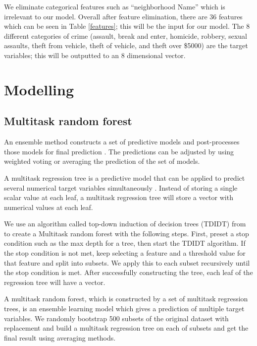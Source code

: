 \documentclass{article}
\begin{document}
We eliminate categorical features such as “neighborhood Name” which is irrelevant to our model. Overall after feature elimination, there are 36 features which can be seen in Table \ref{features}; this will be the input for our model. The 8 different categories of crime (assault, break and enter, homicide, robbery, sexual assaults, theft from vehicle, theft of vehicle, and theft over \$5000) are the target variables; this will be outputted to an 8 dimensional vector.


\section{Modelling}
\label{modelling}

\subsection{Multitask random forest}

An ensemble method constructs a set of predictive models and post-processes those models for final prediction \citep{kocev_ensembles_2007}. The predictions can be adjusted by using weighted voting or averaging the prediction of the set of models.

A multitask regression tree is a predictive model that can be applied to predict several numerical target variables simultaneously \citep{kocev_ensembles_2007}. Instead of storing a single scalar value at each leaf, a multitask regression tree will store a vector with numerical values at each leaf.

We use an algorithm called top-down induction of decision trees (TDIDT) from \citet{quinlan_induction_1986} to create a Multitask random forest with the following steps. First, preset a stop condition such as the max depth for a tree, then start the TDIDT algorithm. If the stop condition is not met, keep selecting a feature and a threshold value for that feature and split into subsets. We apply this to each subset recursively until the stop condition is met. After successfully constructing the tree, each leaf of the regression tree will have a vector.

A multitask random forest, which is constructed by a set of multitask regression trees, is an ensemble learning model which gives a prediction of multiple target variables. We randomly bootstrap 500 subsets of the original dataset with replacement and build a multitask regression tree on each of subsets and get the final result using averaging methods.
\end{document}
